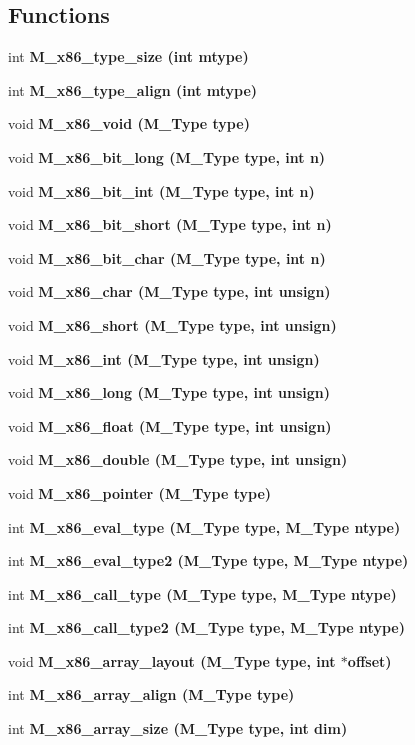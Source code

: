 \subsection*{Functions}
\begin{CompactItemize}
\item 
int \bf{M\_\-x86\_\-type\_\-size} (int mtype)
\item 
int \bf{M\_\-x86\_\-type\_\-align} (int mtype)
\item 
void \bf{M\_\-x86\_\-void} (\bf{M\_\-Type} type)
\item 
void \bf{M\_\-x86\_\-bit\_\-long} (\bf{M\_\-Type} type, int n)
\item 
void \bf{M\_\-x86\_\-bit\_\-int} (\bf{M\_\-Type} type, int n)
\item 
void \bf{M\_\-x86\_\-bit\_\-short} (\bf{M\_\-Type} type, int n)
\item 
void \bf{M\_\-x86\_\-bit\_\-char} (\bf{M\_\-Type} type, int n)
\item 
void \bf{M\_\-x86\_\-char} (\bf{M\_\-Type} type, int unsign)
\item 
void \bf{M\_\-x86\_\-short} (\bf{M\_\-Type} type, int unsign)
\item 
void \bf{M\_\-x86\_\-int} (\bf{M\_\-Type} type, int unsign)
\item 
void \bf{M\_\-x86\_\-long} (\bf{M\_\-Type} type, int unsign)
\item 
void \bf{M\_\-x86\_\-float} (\bf{M\_\-Type} type, int unsign)
\item 
void \bf{M\_\-x86\_\-double} (\bf{M\_\-Type} type, int unsign)
\item 
void \bf{M\_\-x86\_\-pointer} (\bf{M\_\-Type} type)
\item 
int \bf{M\_\-x86\_\-eval\_\-type} (\bf{M\_\-Type} type, \bf{M\_\-Type} ntype)
\item 
int \bf{M\_\-x86\_\-eval\_\-type2} (\bf{M\_\-Type} type, \bf{M\_\-Type} ntype)
\item 
int \bf{M\_\-x86\_\-call\_\-type} (\bf{M\_\-Type} type, \bf{M\_\-Type} ntype)
\item 
int \bf{M\_\-x86\_\-call\_\-type2} (\bf{M\_\-Type} type, \bf{M\_\-Type} ntype)
\item 
void \bf{M\_\-x86\_\-array\_\-layout} (\bf{M\_\-Type} type, int $\ast$offset)
\item 
int \bf{M\_\-x86\_\-array\_\-align} (\bf{M\_\-Type} type)
\item 
int \bf{M\_\-x86\_\-array\_\-size} (\bf{M\_\-Type} type, int dim)
\item 

\end{CompactItemize}
